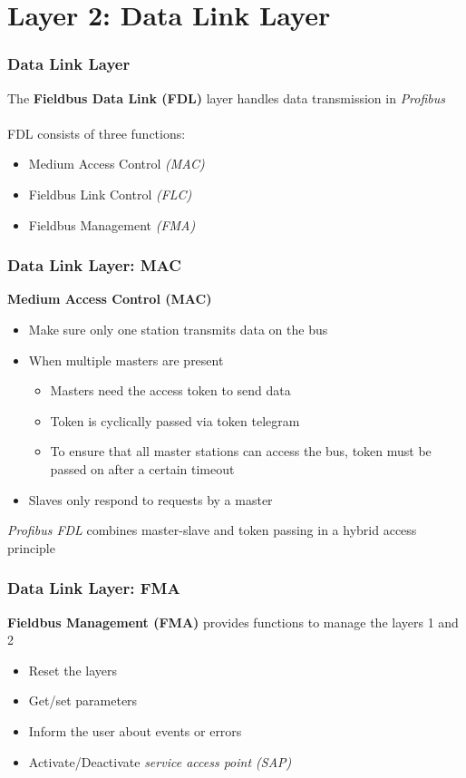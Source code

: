\documentclass{beamer}
\begin{document}
\section{Layer 2: Data Link Layer}
\begin{frame}
  \frametitle{Data Link Layer}
  The \textbf{Fieldbus Data Link (FDL)} layer handles data transmission in
  \textit{Profibus} \\
  \hfill \\
  FDL consists of three functions:
  \begin{itemize}
    \item Medium Access Control \textit{(MAC)}
    \item Fieldbus Link Control \textit{(FLC)}
    \item Fieldbus Management \textit{(FMA)}
  \end{itemize}
\end{frame}

\begin{frame}
  \frametitle{Data Link Layer: MAC}
  \textbf{Medium Access Control (MAC)}
  \begin{itemize}
    \item Make sure only one station transmits data on the bus
    \item When multiple masters are present
      \begin{itemize}
        \item Masters need the access token to send data
        \item Token is cyclically passed via token telegram
        \item To ensure that all master stations can access the bus, token must be passed
          on after a certain timeout
      \end{itemize}
    \item Slaves only respond to requests by a master
  \end{itemize}
  \textit{Profibus FDL} combines master-slave and token passing in a hybrid access principle
\end{frame}

\begin{frame}
  \frametitle{Data Link Layer: FMA}
  \textbf{Fieldbus Management (FMA)} provides functions to manage the layers 1 and 2
    \begin{itemize}
      \item Reset the layers
      \item Get/set parameters
      \item Inform the user about events or errors
      \item Activate/Deactivate \textit{service access point (SAP)}
    \end{itemize}
\end{frame}
\end{document}
